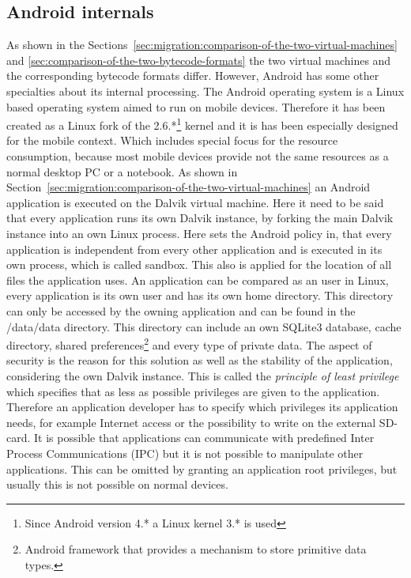 \subsection{Android internals}
\label{sec:android-internals}
As shown in the Sections~\ref{sec:migration:comparison-of-the-two-virtual-machines} and \ref{sec:comparison-of-the-two-bytecode-formats} the two virtual machines and the corresponding bytecode formats differ.
However, Android has some other specialties about its internal processing.
The Android operating system is a Linux based operating system aimed to run on mobile devices.
Therefore it has been created as a Linux fork of the 2.6.*\footnote{Since Android version 4.* a Linux kernel 3.* is used} kernel and it is has been especially designed for the mobile context.
Which includes special focus for the resource consumption, because most mobile devices provide not the same resources as a normal desktop PC or a notebook.
As shown in Section~\ref{sec:migration:comparison-of-the-two-virtual-machines} an Android application is executed on the Dalvik virtual machine.
Here it need to be said that every application runs its own Dalvik instance, by forking the main Dalvik instance into an own Linux process.
Here sets the Android policy in, that every application is independent from every other application and is executed in its own process, which is called sandbox.
This also is applied for the location of all files the application uses.
An application can be compared as an user in Linux, every application is its own user and has its own home directory.
This directory can only be accessed by the owning application and can be found in the /data/data directory.
This directory can include an own SQLite3 database, cache directory, shared preferences\footnote{Android framework that provides a mechanism to store primitive data types.} and every type of private data.
The aspect of security is the reason for this solution as well as the stability of the application, considering the own Dalvik instance.
This is called the \textit{principle of least privilege} which specifies that as less as possible privileges are given to the application.
Therefore an application developer has to specify which privileges its application needs, for example Internet access or the possibility to write on the external SD-card.
It is possible that applications can communicate with predefined Inter Process Communications (IPC) but it is not possible to manipulate other applications.
This can be omitted by granting an application root privileges, but usually this is not possible on normal devices.
